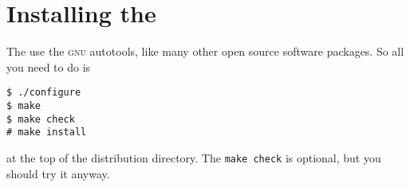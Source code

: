 \chapter{Installing the \nutils}

The \nutils{} use the \textsc{gnu} autotools, like many other open source
software packages. So all you need to do is
\begin{verbatim}
$ ./configure
$ make
$ make check
# make install
\end{verbatim}
at the top of the distribution directory. The \texttt{make check} is optional, but you should try it anyway.
